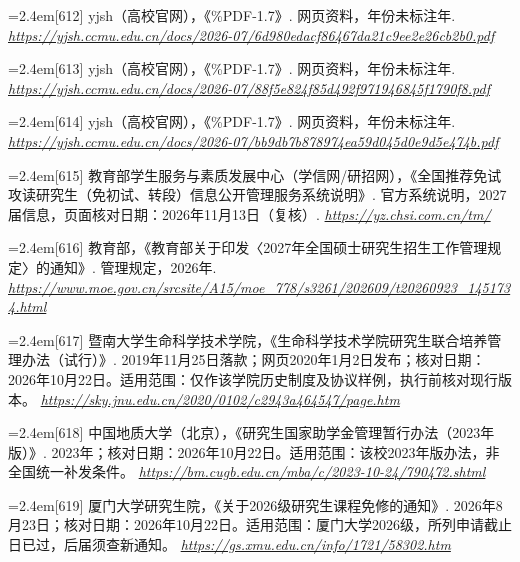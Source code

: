 {\par\noindent\hangindent=2.4em\label{src:S0410}{\color{cAccent}[612]} yjsh（高校官网），《\%PDF-1.7》. 网页资料，年份未标注年. \textit{\url{https://yjsh.ccmu.edu.cn/docs/2026-07/6d980edacf86467da21c9ee2e26cb2b0.pdf}}\par
\par\noindent\hangindent=2.4em\label{src:S0411}{\color{cAccent}[613]} yjsh（高校官网），《\%PDF-1.7》. 网页资料，年份未标注年. \textit{\url{https://yjsh.ccmu.edu.cn/docs/2026-07/88f5e824f85d492f971946845f1790f8.pdf}}\par
\par\noindent\hangindent=2.4em\label{src:S0412}{\color{cAccent}[614]} yjsh（高校官网），《\%PDF-1.7》. 网页资料，年份未标注年. \textit{\url{https://yjsh.ccmu.edu.cn/docs/2026-07/bb9db7b878974ea59d045d0e9d5e474b.pdf}}\par
\par\noindent\hangindent=2.4em\label{src:S0761}{\color{cAccent}[615]} 教育部学生服务与素质发展中心（学信网/研招网），《全国推荐免试攻读研究生（免初试、转段）信息公开管理服务系统说明》. 官方系统说明，2027届信息，页面核对日期：2026年11月13日（复核）. \textit{\url{https://yz.chsi.com.cn/tm/}}\par
\par\noindent\hangindent=2.4em\label{src:S0762}{\color{cAccent}[616]} 教育部，《教育部关于印发〈2027年全国硕士研究生招生工作管理规定〉的通知》. 管理规定，2026年. \textit{\url{https://www.moe.gov.cn/srcsite/A15/moe_778/s3261/202609/t20260923_1451734.html}}\par
\par\noindent\hangindent=2.4em\label{src:S0763}{\color{cAccent}[617]} 暨南大学生命科学技术学院，《生命科学技术学院研究生联合培养管理办法（试行）》. 2019年11月25日落款；网页2020年1月2日发布；核对日期：2026年10月22日。适用范围：仅作该学院历史制度及协议样例，执行前核对现行版本。 \textit{\url{https://sky.jnu.edu.cn/2020/0102/c2943a464547/page.htm}}\par
\par\noindent\hangindent=2.4em\label{src:S0764}{\color{cAccent}[618]} 中国地质大学（北京），《研究生国家助学金管理暂行办法（2023年版）》. 2023年；核对日期：2026年10月22日。适用范围：该校2023年版办法，非全国统一补发条件。 \textit{\url{https://bm.cugb.edu.cn/mba/c/2023-10-24/790472.shtml}}\par
\par\noindent\hangindent=2.4em\label{src:S0765}{\color{cAccent}[619]} 厦门大学研究生院，《关于2026级研究生课程免修的通知》. 2026年8月23日；核对日期：2026年10月22日。适用范围：厦门大学2026级，所列申请截止日已过，后届须查新通知。 \textit{\url{https://gs.xmu.edu.cn/info/1721/58302.htm}}\par
}
